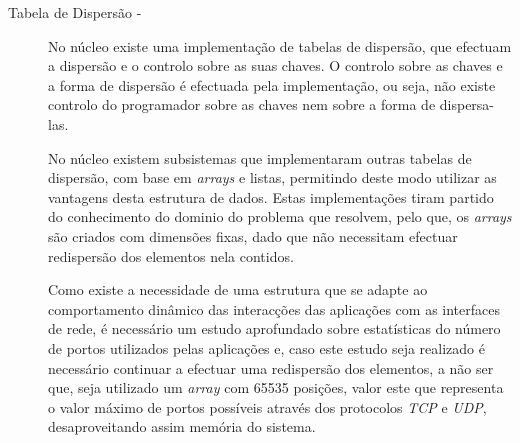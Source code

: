 \begin{description}





\item[Tabela de Dispersão - ]
No núcleo existe uma implementação de tabelas de dispersão, que efectuam a dispersão e o controlo sobre as suas chaves.
O controlo sobre as chaves e a forma de dispersão é efectuada pela implementação, ou seja, não existe controlo do programador sobre as chaves nem sobre a forma de dispersa-las.

No núcleo existem subsistemas que implementaram outras tabelas de dispersão, com base em \textit{arrays} e listas, permitindo deste modo utilizar as vantagens desta estrutura de dados.
Estas implementações tiram partido do conhecimento do dominio do problema que resolvem, pelo que, os \textit{arrays} são criados com dimensões fixas, dado que não necessitam efectuar redispersão dos elementos nela contidos.

Como existe a necessidade de uma estrutura que se adapte ao comportamento dinâmico das interacções das aplicações com as interfaces de rede, é necessário um estudo aprofundado sobre estatísticas do número de portos utilizados pelas aplicações e, caso este estudo seja realizado é necessário continuar a efectuar uma redispersão dos elementos, a não ser que, seja utilizado um \textit{array} com 65535 posições, valor este que representa o valor máximo de portos possíveis através dos protocolos \textit{TCP} e \textit{UDP}, desaproveitando assim memória do sistema.


\end{description}
